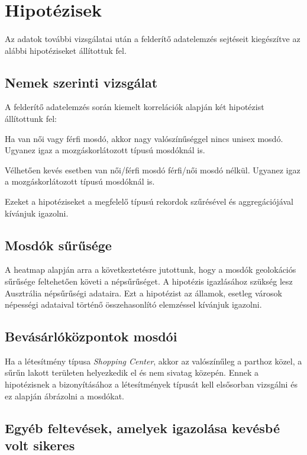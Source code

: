 	\section{Hipotézisek}
	\paragraph{}
	Az adatok további vizsgálatai után a felderítő adatelemzés sejtéseit kiegészítve az alábbi hipotéziseket állítottuk fel. 
	\subsection{Nemek szerinti vizsgálat}
	A felderítő adatelemzés során kiemelt korrelációk alapján két hipotézist állítottunk fel:
	\begin{compactlist}			
		\item Ha van női vagy férfi mosdó, akkor nagy valószínűséggel nincs unisex mosdó. Ugyanez igaz a mozgáskorlátozott típusú mosdóknál is.
		\item Vélhetően kevés esetben van női/férfi mosdó férfi/női mosdó nélkül. Ugyanez igaz a mozgáskorlátozott típusú mosdóknál is.
	\end{compactlist}
	Ezeket a hipotéziseket a megfelelő típusú rekordok szűrésével és aggregációjával kívánjuk igazolni.\par
	\subsection{Mosdók sűrűsége}
	A heatmap alapján arra a következtetésre jutottunk, hogy a mosdók geolokációs sűrűsége feltehetően követi a népsűrűséget. A hipotézis igazlásához szükség lesz Ausztrália népsűrűségi adataira. Ezt a hipotézist az államok, esetleg városok népességi adataival történő összehasonlító elemzéssel kívánjuk igazolni.
	\subsection{Bevásárlóközpontok mosdói}
	Ha a létesítmény típusa \textit{Shopping Center}, akkor az valószínűleg a parthoz közel, a sűrűn lakott területen helyezkedik el és nem sivatag közepén. Ennek a hipotézisnek a bizonyításához a létesítmények típusát kell elsősorban vizsgálni és ez alapján ábrázolni a mosdókat.
	\subsection{Egyéb feltevések, amelyek igazolása kevésbé volt sikeres}
